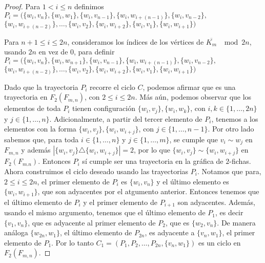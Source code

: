 \begin{proof}
    Para $1 < i \leq n$ definimos
    $P_i=(\{w_i,v_n\},\{w_i,w_1\},\{w_i,v_{n-1}\},\{w_i,w_{i+(n-1)}\},\{w_i,v_{n-2}\},$
    $\{w_i,w_{i+(n-2)}\},\dots,\{w_i,v_2\},\{w_i,w_{i+2}\},\{w_i,v_1\},\{w_i,w_{i+1}\})$

    Para $n+1\leq i \leq 2n$, consideramos los \'indices de los v\'ertices de
    $\overline{K_m}$ $\mod 2n$, usando $2n$ en vez de $0$, para definir
    $P_i=(\{w_i,v_n\},\{w_i,w_{n+1}\},\{w_i,v_{n-1}\},\{w_i,w_{i+(n-1)}\},\{w_i,v_{n-2}\},$
    $\{w_i,w_{i+(n-2)}\},\dots,
    \{w_i,v_2\},\{w_i,w_{i+2}\},\{w_i,v_1\},\{w_i,w_{i+1}\})$

    Dado que la trayectoria $P_i$ recorre el ciclo $C$, podemos afirmar que es
    una trayectoria en $F_2(F_{m,n})$, con $2\leq i \leq 2n$. M\'as a\'un,
    podemos observar que los elementos de toda $P_i$ tienen configuraci\'on
    $\{w_i,v_j\},\{w_i,w_k\}$, con $i, k\in \{1, \dots, 2n\}$ y $j \in \{1,
    \dots, n\}$. Adicionalmente, a partir del tercer elemento de $P_i$, tenemos a
    los elementos con la forma $\{w_i,v_j\},\{w_i,w_{i+j}\}$, con $j \in \{1,
    \dots, n-1\}$.  Por otro lado sabemos que, para toda $i \in \{1, \dots, n\}$
    y $j \in \{1, \dots, m\}$, se cumple que $v_i \sim w_j$ en $F_{m,n}$ y
    adem\'as $|\{w_i,v_j\} \triangle \{w_i, w_{i+j}\}|=2$, por lo que
    $\{w_i,v_j\} \sim \{w_i, w_{i+j}\}$ en $F_2(F_{m.n})$. Entonces $P_i$ s\'i
    cumple ser una trayectoria en la gr\'afica de $2$-fichas. Ahora construimos
    el ciclo deseado usando las trayectorias $P_i$. Notamos que para, $2 \leq i
    \leq 2n$, el primer elemento de $P_i$ es $\{w_i, v_n\}$ y el \'ultimo
    elemento es $\{w_i, w_{i+1}\}$, que son adyacentes por el atgumento
    anterior. Entonces tenemos que el \'ultimo elemento de $P_i$ y el primer
    elemento de $P_{i+1}$ son adyacentes. Adem\'as, usando el mismo argumento,
    tenemos que el \'ultimo elemento de $P_1$, es decir $\{v_1,v_n\}$, que es
    adyacente al primer elemento de $P_2$, que es $\{w_2,v_n\}$. De manera
    an\'aloga $\{w_{2n},w_1\}$, el \'ultimo elemento de $P_{2n}$, es adyacente a
    $\{v_n,w_1\}$, el primer elemento de $P_1$. Por lo tanto $C_1 = (P_1,P_2,
    \dots, P_{2n},\{v_n,w_1\})$ es un ciclo en $F_2(F_{m,n})$. 


\end{proof}
